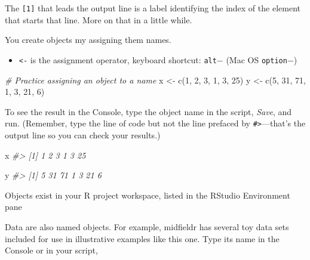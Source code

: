 \documentclass[
]{book}
\newenvironment{Shaded}{\begin{snugshade}}{\end{snugshade}}
\newcommand{\CommentTok}[1]{\textcolor[rgb]{0.56,0.35,0.01}{\textit{#1}}}
\newcommand{\DecValTok}[1]{\textcolor[rgb]{0.00,0.00,0.81}{#1}}
\newcommand{\FunctionTok}[1]{\textcolor[rgb]{0.00,0.00,0.00}{#1}}
\newcommand{\NormalTok}[1]{#1}
\newcommand{\OtherTok}[1]{\textcolor[rgb]{0.56,0.35,0.01}{#1}}
\providecommand{\tightlist}{%
  \setlength{\itemsep}{0pt}\setlength{\parskip}{0pt}}
\begin{document}
The \texttt{{[}1{]}} that leads the output line is a label identifying the index of the element that starts that line. More on that in a little while.

You create objects my assigning them names.

\begin{itemize}
\tightlist
\item
  \texttt{\textless{}-} is the assignment operator, keyboard shortcut: \texttt{alt}\(-\) (Mac OS \texttt{option}\(-\))
\end{itemize}

\begin{Shaded}
\begin{Highlighting}[]
\CommentTok{\# Practice assigning an object to a name}
\NormalTok{x }\OtherTok{\textless{}{-}} \FunctionTok{c}\NormalTok{(}\DecValTok{1}\NormalTok{, }\DecValTok{2}\NormalTok{, }\DecValTok{3}\NormalTok{, }\DecValTok{1}\NormalTok{, }\DecValTok{3}\NormalTok{, }\DecValTok{25}\NormalTok{)}
\NormalTok{y }\OtherTok{\textless{}{-}} \FunctionTok{c}\NormalTok{(}\DecValTok{5}\NormalTok{, }\DecValTok{31}\NormalTok{, }\DecValTok{71}\NormalTok{, }\DecValTok{1}\NormalTok{, }\DecValTok{3}\NormalTok{, }\DecValTok{21}\NormalTok{, }\DecValTok{6}\NormalTok{)}
\end{Highlighting}
\end{Shaded}

To see the result in the Console, type the object name in the script, \emph{Save}, and run. (Remember, type the line of code but not the line prefaced by \texttt{\#\textgreater{}}---that's the output line so you can check your results.)

\begin{Shaded}
\begin{Highlighting}[]
\NormalTok{x}
\CommentTok{\#\textgreater{} [1]  1  2  3  1  3 25}

\NormalTok{y}
\CommentTok{\#\textgreater{} [1]  5 31 71  1  3 21  6}
\end{Highlighting}
\end{Shaded}

Objects exist in your R project workspace, listed in the RStudio Environment pane

Data are also named objects. For example, midfieldr has several toy data sets included for use in illustrative examples like this one. Type its name in the Console or in your script,
\end{document}
